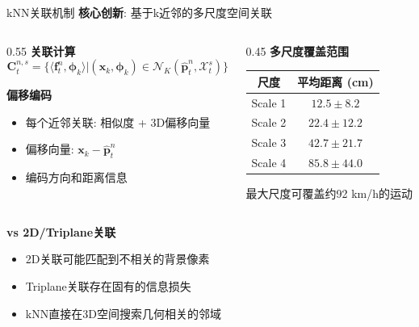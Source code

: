 \documentclass{ctexbeamer}
\begin{document}
\begin{frame}{kNN关联机制}
  \textbf{核心创新}: 基于k近邻的多尺度空间关联
  \vspace{0.2cm}
  
  \begin{columns}[T]
    \begin{column}{0.55\textwidth}
      \textbf{关联计算}
      \begin{equation*}
        \mathbf{C}_t^{n,s} = \{\langle \mathbf{f}_t^n, \mathbf{\phi}_k \rangle | (\mathbf{x}_k, \mathbf{\phi}_k) \in \mathcal{N}_K(\hat{\mathbf{p}}_t^n, \mathcal{X}_t^s)\}
      \end{equation*}
      
      \textbf{偏移编码}
      \begin{itemize}
        \item 每个近邻关联: 相似度 + 3D偏移向量
        \item 偏移向量: $\mathbf{x}_k - \hat{\mathbf{p}}_t^n$
        \item 编码方向和距离信息
      \end{itemize}
    \end{column}
    \begin{column}{0.45\textwidth}
      \textbf{多尺度覆盖范围}
      \begin{table}
        \footnotesize
        \begin{tabular}{cc}
          \hline
          尺度 & 平均距离 (cm) \\
          \hline
          Scale 1 & $12.5 \pm 8.2$ \\
          Scale 2 & $22.4 \pm 12.2$ \\
          Scale 3 & $42.7 \pm 21.7$ \\
          Scale 4 & $85.8 \pm 44.0$ \\
          \hline
        \end{tabular}
      \end{table}
      最大尺度可覆盖约92 km/h的运动
    \end{column}
  \end{columns}
  
  \vspace{0.3cm}
  \textbf{vs 2D/Triplane关联}
  \begin{itemize}
    \item 2D关联可能匹配到不相关的背景像素
    \item Triplane关联存在固有的信息损失
    \item \alert{kNN直接在3D空间搜索几何相关的邻域}
  \end{itemize}
\end{frame}
\end{document}
